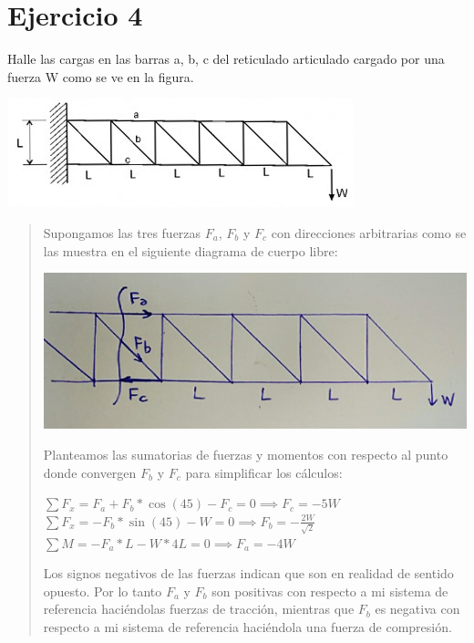 \documentclass[a4paper,12pt,twoside,final,spanish]{article}
\begin{document}
\section{Ejercicio 4}

Halle las cargas en las barras a, b, c del reticulado articulado cargado por una fuerza W como se ve en la figura.  


\includegraphics[width=0.9\linewidth,keepaspectratio]{ejercicio4}


\dotfill

\begin{quote}
Supongamos las tres fuerzas $F_{a}$, $F_{b}$ y $F_{c}$ con direcciones arbitrarias como se las muestra en el siguiente diagrama de cuerpo libre:

\begin{center}
\includegraphics[width=0.8\linewidth,keepaspectratio]{ejercicio42}
\end{center}

Planteamos las sumatorias de fuerzas y momentos con respecto al punto donde convergen $F_{b}$ y $F_{c}$ para simplificar los cálculos:

$\sum F_{x}=F_{a}+F_{b}*\cos(45)-F_{c}=0 \implies F_{c}=-5W$\\
$\sum F_{x}=-F_{b}*\sin(45)-W=0 \implies F_{b}=-\frac{2W}{\sqrt{2}}$\\
$\sum M=-F_{a}*L-W*4L=0 \implies F_{a}=-4W$

Los signos negativos de las fuerzas indican que son en realidad de sentido opuesto. Por lo tanto $F_{a}$ y $F_{b}$ son positivas con respecto a mi sistema de referencia haciéndolas fuerzas de tracción, mientras que $F_{b}$ es negativa con respecto a mi sistema de referencia haciéndola una fuerza de compresión.
\end{quote}
\end{document}
